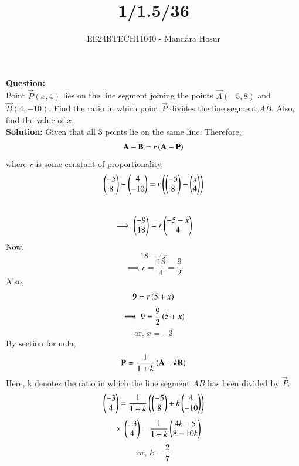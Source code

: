 \documentclass[journal]{IEEEtran}
\begin{document}

\vspace{3cm}

\title{1/1.5/36}
\author{EE24BTECH11040 - Mandara Hosur}
{\let\newpage\relax\maketitle}

\renewcommand{\thefigure}{\theenumi}
\renewcommand{\thetable}{\theenumi}
\setlength{\intextsep}{10pt} %


\renewcommand{\thetable}{\theenumi}


\textbf{Question:}\\
Point $\vec{P}(x,4)$ lies on the line segment joining the points $\vec{A}(-5,8)$ and $\vec{B}(4,-10)$. Find the ratio in which point $\vec{P}$ divides the line segment $AB$. Also, find the value of $x$.
\\
\textbf{Solution:}
Given that all 3 points lie on the same line. Therefore, $$\mathbf{A}-\mathbf{B}=r\left(\mathbf{A}-\mathbf{P}\right)$$ where $r$ is some constant of proportionality. \\
$$\begin{pmatrix}-5\\8\end{pmatrix} - \begin{pmatrix}4\\-10\end{pmatrix} = r\left(\begin{pmatrix}-5\\8\end{pmatrix} - \begin{pmatrix}x\\4\end{pmatrix}\right)$$\\
$$\implies \begin{pmatrix}-9\\18\end{pmatrix} = r\begin{pmatrix}-5-x\\4\end{pmatrix}$$
Now, $$18=4r$$
$$\implies r=\frac{18}{4}=\frac{9}{2}$$
Also, $$9=r\left(5+x\right)$$
$$\implies 9=\frac{9}{2}\left(5+x\right)$$
$$\text{or, }x=-3$$
By section formula, 
$$\mathbf{P}=\frac{1}{1+k}\left(\mathbf{A}+k\mathbf{B}\right)$$
Here, k denotes the ratio in which the line segment $AB$ has been divided by $\vec{P}$.
$$\begin{pmatrix}-3\\4\end{pmatrix}=\frac{1}{1+k}\left(\begin{pmatrix}-5\\8\end{pmatrix}+k\begin{pmatrix}4\\-10\end{pmatrix}\right)$$
$$\implies \begin{pmatrix}-3\\4\end{pmatrix}=\frac{1}{1+k}\begin{pmatrix}4k-5\\8-10k\end{pmatrix}$$
$$\text{or, }k=\frac{2}{7}$$
\end{document}
